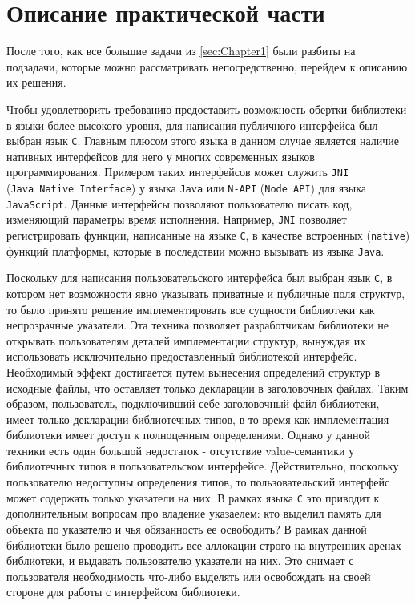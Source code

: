 \section{Описание практической части}
\label{sec:Chapter4} 

\sloppy

После того, как все большие задачи из \autoref{sec:Chapter1} были разбиты на подзадачи, которые можно рассматривать непосредственно, перейдем к описанию их решения.

Чтобы удовлетворить требованию предоставить возможность обертки библиотеки в языки более высокого уровня, для написания публичного интерфейса был выбран язык \texttt{C}. Главным плюсом этого языка в данном случае является наличие нативных интерфейсов для него у многих современных языков программирования. Примером таких интерфейсов может служить \texttt{JNI} (\texttt{Java~Native~Interface}) \cite{jni} у языка \texttt{Java} или \texttt{N-API} (\texttt{Node~API}) \cite{napi} для языка \texttt{JavaScript}. Данные интерфейсы позволяют пользователю писать код, изменяющий параметры время исполнения. Например, \texttt{JNI} позволяет регистрировать функции, написанные на языке \texttt{C}, в качестве встроенных (\texttt{native}) функций платформы, которые в последствии можно вызывать из языка \texttt{Java}.

Поскольку для написания пользовательского интерфейса был выбран язык \texttt{C}, в котором нет возможности явно указывать приватные и публичные поля структур, то было принято решение имплементировать все сущности библиотеки как непрозрачные указатели. Эта техника позволяет разработчикам библиотеки не открывать пользователям деталей имплементации структур, вынуждая их использовать исключительно предоставленный библиотекой интерфейс. Необходимый эффект достигается путем вынесения определений структур в исходные файлы, что оставляет только декларации в заголовочных файлах. Таким образом, пользователь, подключивший себе заголовочный файл библиотеки, имеет только декларации библиотечных типов, в то время как имплементация библиотеки имеет доступ к полноценным определениям. Однако у данной техники есть один большой недостаток - отсутствие value-семантики у библиотечных типов в пользовательском интерфейсе. Действительно, поскольку пользователю недоступны определения типов, то пользовательский интерфейс может содержать только указатели на них. В рамках языка \texttt{C} это приводит к дополнительным вопросам про владение указаелем: кто выделил память для объекта по указателю и чья обязанность ее освободить? В рамках данной библиотеки было решено проводить все аллокации строго на внутренних аренах библиотеки, и выдавать пользователю указатели на них. Это снимает с пользователя необходимость что-либо выделять или освобождать на своей стороне для работы с интерфейсом библиотеки.

